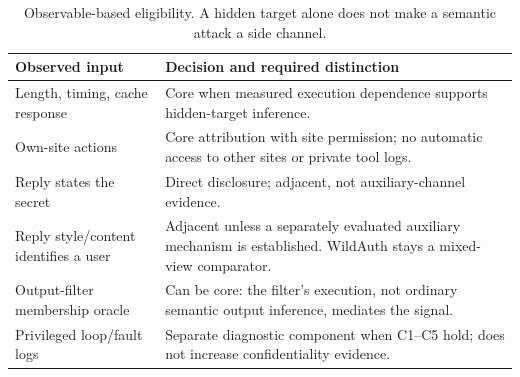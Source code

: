 \begin{table}[t]\centering\footnotesize
\caption{Observable-based eligibility. A hidden target alone does not make a semantic attack a side channel.}\label{tab:boundary-rules}
\begin{tabularx}{\columnwidth}{@{}p{}Y@{}}\toprule
Observed input & Decision and required distinction\\\midrule
Length, timing, cache response & Core when measured execution dependence supports hidden-target inference.\\
Own-site actions & Core attribution with site permission; no automatic access to other sites or private tool logs.\\
Reply states the secret & Direct disclosure; adjacent, not auxiliary-channel evidence.\\
Reply style/content identifies a user & Adjacent unless a separately evaluated auxiliary mechanism is established. WildAuth stays a mixed-view comparator.\\
Output-filter membership oracle & Can be core: the filter's execution, not ordinary semantic output inference, mediates the signal.\\
Privileged loop/fault logs & Separate diagnostic component when C1--C5 hold; does not increase confidentiality evidence.\\\bottomrule
\end{tabularx}\end{table}
